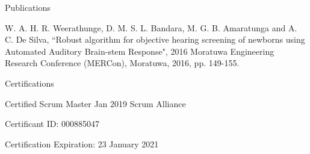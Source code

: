 \documentclass[
	11pt, %
]{./../assets/resume} %
\begin{document}





\begin{rSection}{Publications}

    \begin{rBulletedList}
    	\item 
        W. A. H. R. Weerathunge, D. M. S. L. Bandara, M. G. B. Amaratunga and A. C. De Silva, ``Robust algorithm for objective hearing screening of newborns using Automated Auditory Brain-stem Response", 2016 Moratuwa Engineering Research Conference (MERCon), Moratuwa, 2016, pp. 149-155.
    \end{rBulletedList}

\end{rSection}


\begin{rSection}{Certifications}
    \begin{rCertifications}
    {Certified Scrum Master} {Jan 2019}
    {Scrum Alliance}
    \item Certificant ID: 000885047
    \item Certification Expiration:  23 January 2021
    \end{rCertifications}
\end{rSection}

\end{document}
